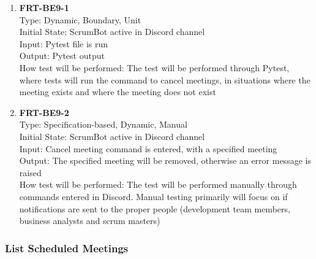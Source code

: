 \documentclass[12pt, titlepage]{article}
\begin{document}
\begin{enumerate}
    \item{\textbf{FRT-BE9-1}}\\
    Type: Dynamic, Boundary, Unit\\
    Initial State: ScrumBot active in Discord channel\\
    Input: Pytest file is run\\
    Output: Pytest output\\
    How test will be performed: The test will be performed through Pytest, where tests will run the command to cancel meetings, in situations where the meeting exists and where the meeting does not exist\\
    
    \item{\textbf{FRT-BE9-2}}\\
    Type: Specification-based, Dynamic, Manual\\
    Initial State: ScrumBot active in Discord channel\\
    Input: Cancel meeting command is entered, with a specified meeting\\
    Output: The specified meeting will be removed, otherwise an error message is raised\\
    How test will be performed: The test will be performed manually through commands entered in Discord. Manual testing primarily will focus on if notifications are sent to the proper people (development team members, business analysts and scrum masters)\\
\end{enumerate}

\subsubsection{List Scheduled Meetings}
\end{document}
